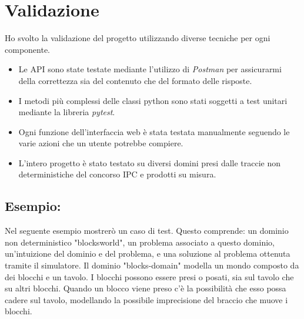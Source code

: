 \documentclass[a4paper, 11pt, titlepage, twoside, openany]{book}
\begin{document}
\chapter{Validazione}
Ho svolto la validazione del progetto utilizzando diverse tecniche per ogni componente. 
\begin{itemize}
    \item Le API sono state testate mediante l'utilizzo di \textit{Postman}\cite{postman} per assicurarmi della correttezza sia del contenuto che del formato delle risposte.
    \item I metodi più complessi delle classi python sono stati soggetti a test unitari mediante la libreria \textit{pytest}.
    \item Ogni funzione dell'interfaccia web è stata testata manualmente seguendo le varie azioni che un utente potrebbe compiere.
    \item L'intero progetto è stato testato su diversi domini presi dalle traccie non deterministiche del concorso IPC e prodotti su misura.
\end{itemize}

\section{Esempio:}
Nel seguente esempio mostrerò un caso di test. Questo comprende: un dominio non deterministico "blocksworld", un problema associato a questo dominio, un'intuizione del dominio e del problema, e una soluzione al problema ottenuta tramite il simulatore.
Il dominio "blocks-domain" modella un mondo composto da dei blocchi e un tavolo. I blocchi possono essere presi o posati, sia sul tavolo che su altri blocchi. Quando un blocco viene preso c'è la possibilità che esso possa cadere sul tavolo, modellando la possibile imprecisione del braccio che muove i blocchi.
\end{document}
